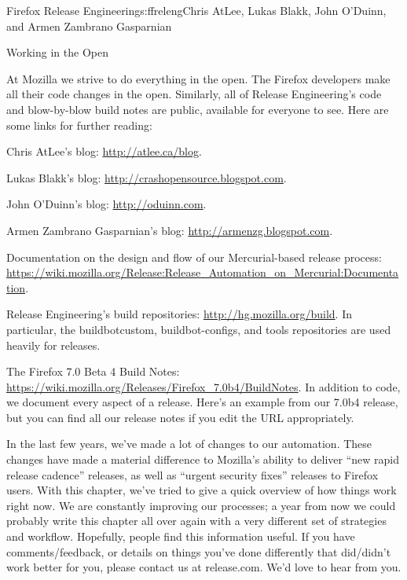\begin{aosachapter}{Firefox Release Engineering}{s:ffreleng}{Chris AtLee, Lukas Blakk, John O'Duinn, and Armen Zambrano Gasparnian}
\begin{aosasect1}{Working in the Open}

At Mozilla we strive to do everything in the open. The Firefox
developers make all their code changes in the open. Similarly, all of
Release Engineering's code and blow-by-blow build notes are public,
available for everyone to see.  Here are some links for further
reading:

\begin{aosaitemize}  

\item Chris AtLee's blog: \url{http://atlee.ca/blog}.

\item Lukas Blakk's blog: \url{http://crashopensource.blogspot.com}.

\item John O'Duinn's blog: \url{http://oduinn.com}.

\item Armen Zambrano Gasparnian's blog: \url{http://armenzg.blogspot.com}.

\item Documentation on the design and flow of our Mercurial-based release process: \url{https://wiki.mozilla.org/Release:Release\_Automation\_on\_Mercurial:Documentation}.

\item Release Engineering's build repositories:
  \url{http://hg.mozilla.org/build}.  In particular, the
  buildbotcustom, buildbot-configs, and tools repositories are used
  heavily for releases.

\item The Firefox 7.0 Beta 4 Build Notes:
  \url{https://wiki.mozilla.org/Releases/Firefox_7.0b4/BuildNotes}.
  In addition to code, we document every aspect of a release. Here's
  an example from our 7.0b4 release, but you can find all our release
  notes if you edit the URL appropriately.

\end{aosaitemize}

In the last few years, we've made a lot of changes to our automation.
These changes have made a material difference to Mozilla's ability to
deliver ``new rapid release cadence'' releases, as well as ``urgent
security fixes'' releases to Firefox users. With this chapter, we've
tried to give a quick overview of how things work right now. We are
constantly improving our processes; a year from now we could probably
write this chapter all over again with a very different set of
strategies and workflow. Hopefully, people find this information
useful. If you have comments/feedback, or details on things you've
done differently that did/didn't work better for you, please contact
us at release\@mozilla.com. We'd love to hear from you.
  
\end{aosasect1}

\end{aosachapter}
